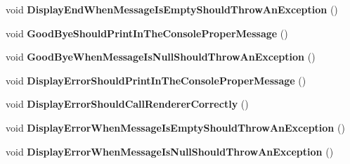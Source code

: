 \begin{DoxyCompactItemize}
\item 
\hypertarget{class_minesweeper_1_1_unit_tests_1_1_game_1_1_u_i_manager_test_a10a158aaef78f4cd5ffa34d4ee37383b}{void {\bfseries Display\+End\+When\+Message\+Is\+Empty\+Should\+Throw\+An\+Exception} ()}\label{class_minesweeper_1_1_unit_tests_1_1_game_1_1_u_i_manager_test_a10a158aaef78f4cd5ffa34d4ee37383b}

\item 
\hypertarget{class_minesweeper_1_1_unit_tests_1_1_game_1_1_u_i_manager_test_ae8c434a0a6f0122305be9243ffc89113}{void {\bfseries Good\+Bye\+Should\+Print\+In\+The\+Console\+Proper\+Message} ()}\label{class_minesweeper_1_1_unit_tests_1_1_game_1_1_u_i_manager_test_ae8c434a0a6f0122305be9243ffc89113}

\item 
\hypertarget{class_minesweeper_1_1_unit_tests_1_1_game_1_1_u_i_manager_test_a2aaf2f56748c63fc415270a0dca71e73}{void {\bfseries Good\+Bye\+When\+Message\+Is\+Null\+Should\+Throw\+An\+Exception} ()}\label{class_minesweeper_1_1_unit_tests_1_1_game_1_1_u_i_manager_test_a2aaf2f56748c63fc415270a0dca71e73}

\item 
\hypertarget{class_minesweeper_1_1_unit_tests_1_1_game_1_1_u_i_manager_test_aa3e6d09173cd088d2e6b6fed42a724d3}{void {\bfseries Display\+Error\+Should\+Print\+In\+The\+Console\+Proper\+Message} ()}\label{class_minesweeper_1_1_unit_tests_1_1_game_1_1_u_i_manager_test_aa3e6d09173cd088d2e6b6fed42a724d3}

\item 
\hypertarget{class_minesweeper_1_1_unit_tests_1_1_game_1_1_u_i_manager_test_ae664d293a4d7540900737e632a69e4f8}{void {\bfseries Display\+Error\+Should\+Call\+Renderer\+Correctly} ()}\label{class_minesweeper_1_1_unit_tests_1_1_game_1_1_u_i_manager_test_ae664d293a4d7540900737e632a69e4f8}

\item 
\hypertarget{class_minesweeper_1_1_unit_tests_1_1_game_1_1_u_i_manager_test_a733a53d44b88edd65b980dc0a53569f8}{void {\bfseries Display\+Error\+When\+Message\+Is\+Empty\+Should\+Throw\+An\+Exception} ()}\label{class_minesweeper_1_1_unit_tests_1_1_game_1_1_u_i_manager_test_a733a53d44b88edd65b980dc0a53569f8}

\item 
\hypertarget{class_minesweeper_1_1_unit_tests_1_1_game_1_1_u_i_manager_test_a8e65c909b924e62e1f4f4d2d98ef03e2}{void {\bfseries Display\+Error\+When\+Message\+Is\+Null\+Should\+Throw\+An\+Exception} ()}\label{class_minesweeper_1_1_unit_tests_1_1_game_1_1_u_i_manager_test_a8e65c909b924e62e1f4f4d2d98ef03e2}


\end{DoxyCompactItemize}
